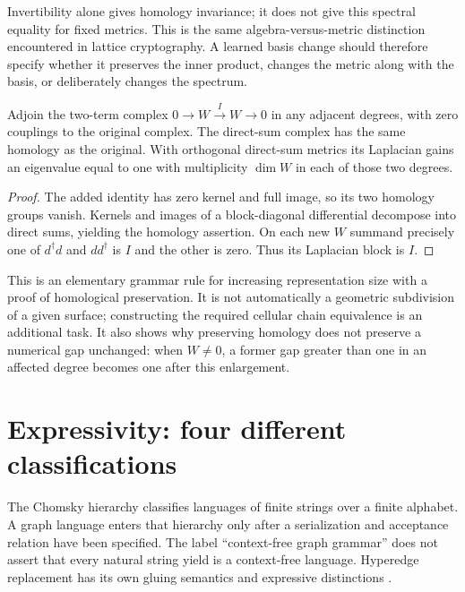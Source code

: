 Invertibility alone gives homology invariance; it does not give this spectral equality for fixed metrics. This is the same algebra-versus-metric distinction encountered in lattice cryptography. A learned basis change should therefore specify whether it preserves the inner product, changes the metric along with the basis, or deliberately changes the spectrum.

\begin{proposition}
Adjoin the two-term complex $0\to W\xrightarrow{I}W\to0$ in any adjacent degrees, with zero couplings to the original complex. The direct-sum complex has the same homology as the original. With orthogonal direct-sum metrics its Laplacian gains an eigenvalue equal to one with multiplicity $\dim W$ in each of those two degrees.
\end{proposition}
\begin{proof}
The added identity has zero kernel and full image, so its two homology groups vanish. Kernels and images of a block-diagonal differential decompose into direct sums, yielding the homology assertion. On each new $W$ summand precisely one of $d^\dagger d$ and $dd^\dagger$ is $I$ and the other is zero. Thus its Laplacian block is $I$.
\end{proof}

This is an elementary grammar rule for increasing representation size with a proof of homological preservation. It is not automatically a geometric subdivision of a given surface; constructing the required cellular chain equivalence is an additional task. It also shows why preserving homology does not preserve a numerical gap unchanged: when $W\ne0$, a former gap greater than one in an affected degree becomes one after this enlargement.

\section{Expressivity: four different classifications}

The Chomsky hierarchy classifies languages of finite strings over a finite alphabet. A graph language enters that hierarchy only after a serialization and acceptance relation have been specified. The label ``context-free graph grammar'' does not assert that every natural string yield is a context-free language. Hyperedge replacement has its own gluing semantics and expressive distinctions \cite{TGhrg}.


